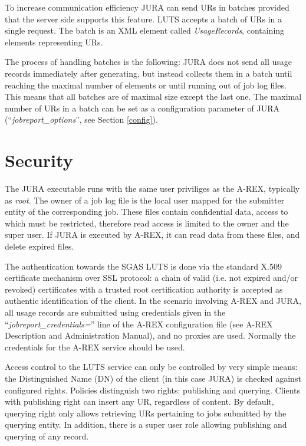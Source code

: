 \documentclass{article}                            %
\begin{document}




To increase communication efficiency JURA can send URs in batches
provided that the server side supports this feature. LUTS accepts a
batch of URs in a single request. The batch is an XML element called
\textit{UsageRecords}, containing elements representing URs. 

The process of handling batches is the following: JURA does not send
all usage records immediately after generating, but instead collects
them in a batch until reaching the maximal number of elements or until
running out of job log files. This means that all batches are of
maximal size except the last one. The maximal number of URs in a batch
can be set as a configuration parameter of JURA
(``\textit{jobreport\_options}'', see Section \ref{config}).


\section{Security}
The JURA executable runs with the same user priviliges as the A-REX,
typically as \textit{root}. The owner of a job log file is the local
user mapped for the submitter entity of the corresponding job. These
files contain confidential data, access to which must be restricted,
therefore read access is limited to the owner and the super user. If
JURA is executed by A-REX, it can read data from these files, and
delete expired files.

The authentication towards the SGAS LUTS is done via the standard
X.509 certificate mechanism over SSL protocol: a chain of valid
(i.e. not expired and/or revoked) certificates with a trusted root
certification authority is accepted as authentic identification of the
client. In the scenario involving A-REX and JURA,
all usage records are submitted using credentials given in the
``\textit{jobreport\_credentials=}'' line of the A-REX configuration file
(see A-REX Description and Administration Manual\cite{arex}), and no
proxies are used. Normally the credentials for the A-REX service
should be used.

Access control to the LUTS service can only be controlled by very
simple means: the Distinguished Name (DN) of the client (in this case
JURA) is checked against configured rights. Policies distinguish two
rights: publishing and querying. Clients with publishing right can
insert any UR, regardless of content. By default, querying right only
allows retrieving URs pertaining to jobs submitted by the querying
entity. In addition, there is a super user role allowing publishing
and querying of any record.
\end{document}
